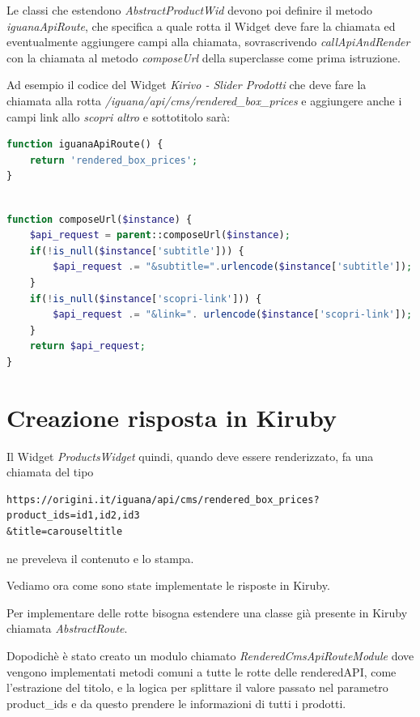 Le classi che estendono \emph{AbstractProductWid} devono poi definire il metodo \emph{iguanaApiRoute}, che specifica
a quale rotta il Widget deve fare la chiamata ed eventualmente aggiungere campi alla chiamata, sovrascrivendo \emph{callApiAndRender} con la 
chiamata al metodo \emph{composeUrl} della superclasse come prima istruzione.

Ad esempio il codice del Widget \emph{Kirivo - Slider Prodotti} che deve fare la chiamata alla rotta \emph{/iguana/api/cms/rendered\_box\_prices} e aggiungere  anche i campi link allo \emph{scopri altro} e sottotitolo sarà:

\begin{lstlisting}[style=customphp, language=Php,caption={Viene sovrascritto \emph{iguanaApiRoute} da \emph{ProductsWidget} per specificare la chiamata da effettuare}] 
function iguanaApiRoute() {
    return 'rendered_box_prices';
}
\end{lstlisting}

\begin{lstlisting}[style=customphp, language=Php,caption={Ridefinendo \emph{composeUrl} vengono aggiunti ulteriori campi specifici del Widget \emph{ProductsWidget}}] 

function composeUrl($instance) {
    $api_request = parent::composeUrl($instance);
    if(!is_null($instance['subtitle'])) {
        $api_request .= "&subtitle=".urlencode($instance['subtitle']);
    }
    if(!is_null($instance['scopri-link'])) {
        $api_request .= "&link=". urlencode($instance['scopri-link']);
    }
    return $api_request;
}
\end{lstlisting}

\section{Creazione risposta in Kiruby}

Il Widget \emph{ProductsWidget} quindi, quando deve essere renderizzato, fa una chiamata del tipo
\begin{verbatim}
https://origini.it/iguana/api/cms/rendered_box_prices?product_ids=id1,id2,id3
&title=carouseltitle
\end{verbatim}
ne preveleva il contenuto e lo stampa.

Vediamo ora come sono state implementate le risposte in Kiruby.

Per implementare delle rotte bisogna estendere una classe già presente in Kiruby chiamata \emph{AbstractRoute}.

Dopodichè è stato creato un modulo chiamato \emph{RenderedCmsApiRouteModule} dove vengono implementati metodi comuni
a tutte le rotte delle renderedAPI, come l'estrazione del titolo, e la logica per splittare il valore passato nel
parametro product\_ids e da questo prendere le informazioni di tutti i prodotti.

